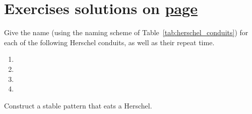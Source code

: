 \section*{Exercises \hfill \normalfont\textsf{\small solutions on \hyperlink{solutions_stable_circuitry}{page \pageref{solutions_stable_circuitry}}}}
\label{sec:stable_exercises}
\vspace*{-0.4cm}\hrulefill\vspace*{-0.3cm}\footnotesize\begin{multicols}{2}\vspace*{-0.4cm}\raggedcolumns{}
	\setlength{\parskip}{0pt}
	
	\begin{problem}\label{exer:name_conduit}
		Give the name (using the naming scheme of Table~\ref{tab:herschel_conduits}) for each of the following Herschel conduits, as well as their repeat time.\vspace*{-0.25cm}
		
		\begin{multicols}{2}
			\begin{enumerate}
				\item[\bf\color{ocre}(a)] 
				
				\item[\bf\color{ocre}(c)] 
				
				\item[\bf\color{ocre}(b)] 
				
				\item[\bf\color{ocre}(d)] 
			\end{enumerate}
		\end{multicols}
	\end{problem}
	
	
	\mfilbreak
	
	
	\begin{problem}\label{exer:eat_herschel}
		Construct a stable pattern that eats a Herschel.
		
	\end{problem}
	

\end{multicols}
